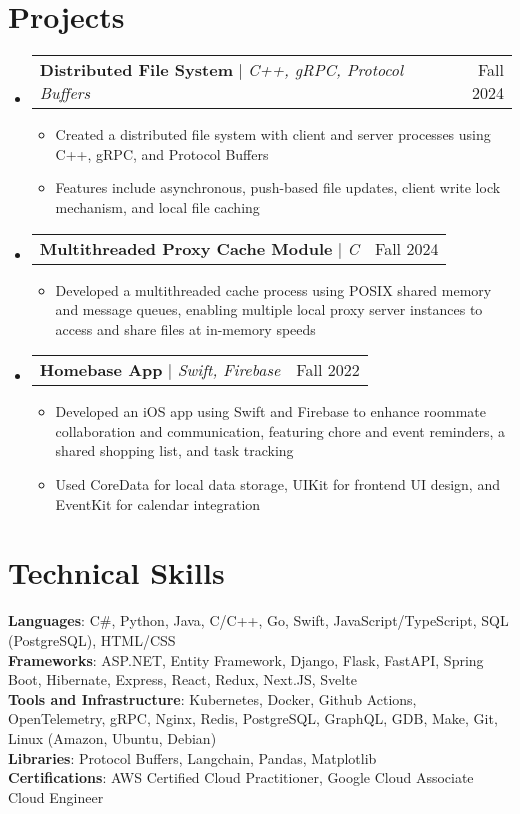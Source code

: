 \documentclass[letterpaper,11pt]{article}
\makeatletter
\newcommand{\resumeItem}[1]{
  \item\small{
    {#1 \vspace{-2pt}}
  }
}
\newcommand{\resumeProjectHeading}[2]{
    \item
    \begin{tabular*}{0.97\textwidth}{l@{\extracolsep{\fill}}r}
      \small#1 & #2 \\
    \end{tabular*}\vspace{-7pt}
}
\newcommand{\resumeSubHeadingListStart}{\begin{itemize}[leftmargin=0.15in, label={}]}
\newcommand{\resumeSubHeadingListEnd}{\end{itemize}}
\newcommand{\resumeItemListStart}{\begin{itemize}}
\newcommand{\resumeItemListEnd}{\end{itemize}\vspace{-5pt}}
\makeatother
\begin{document}
\section{Projects}
    \resumeSubHeadingListStart
      \resumeProjectHeading
          {\textbf{Distributed File System} $|$ \emph{C++, gRPC, Protocol Buffers}}{Fall 2024}
          \resumeItemListStart
            \resumeItem{Created a distributed file system with client and server processes using C++, gRPC, and Protocol Buffers}
            \resumeItem{Features include asynchronous, push-based file updates, client write lock mechanism, and local file caching}
          \resumeItemListEnd
      \resumeProjectHeading
          {\textbf{Multithreaded Proxy Cache Module} $|$ \emph{C}}{Fall 2024}
          \resumeItemListStart
            \resumeItem{Developed a multithreaded cache process using POSIX shared memory and message queues, enabling multiple local proxy server instances to access and share files at in-memory speeds}
          \resumeItemListEnd
      \resumeProjectHeading
          {\textbf{Homebase App} $|$ \emph{Swift, Firebase}}{Fall 2022}
          \resumeItemListStart
            \resumeItem{Developed an iOS app using Swift and Firebase to enhance roommate collaboration and communication, featuring chore and event reminders, a shared shopping list, and task tracking}
            \resumeItem{Used CoreData for local data storage, UIKit for frontend UI design, and EventKit for calendar integration}
          \resumeItemListEnd
    \resumeSubHeadingListEnd

%
\section{Technical Skills}
 \begin{itemize}[leftmargin=0.15in, label={}]
    \small{\item{
     \textbf{Languages}{: C\#, Python, Java, C/C++, Go, Swift, JavaScript/TypeScript, SQL (PostgreSQL), HTML/CSS} \\
     \textbf{Frameworks}{: ASP.NET, Entity Framework, Django, Flask, FastAPI, Spring Boot, Hibernate, Express, React, Redux, Next.JS, Svelte} \\
         \textbf{Tools and Infrastructure}{: Kubernetes, Docker, Github Actions, OpenTelemetry, gRPC, Nginx, Redis, PostgreSQL, GraphQL, GDB, Make, Git, Linux (Amazon, Ubuntu, Debian) } \\
     \textbf{Libraries}{: Protocol Buffers, Langchain, Pandas, Matplotlib } \\
     \textbf{Certifications}{: AWS Certified Cloud Practitioner, Google Cloud Associate Cloud Engineer}
    }}
 \end{itemize}

\end{document}
